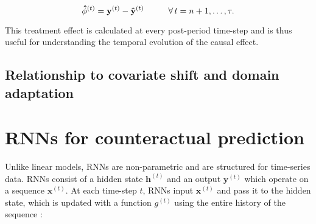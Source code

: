 \documentclass[hidelinks,12pt]{article}
\begin{document}
\begin{equation}
  \mathbf{\hat{\phi}}^{(t)} = \mathbf{y}^{(t)} - \mathbf{\hat{y}}^{(t)} \hspace{10mm} \forall \, t = n+1, \ldots, \tau. \label{eq:pointwise}
\end{equation}

This treatment effect is calculated at every post-period time-step and is thus useful for understanding the temporal evolution of the causal effect.

\subsection{Relationship to covariate shift and domain adaptation}





\section{RNNs for counteractual prediction}

Unlike linear models, RNNs are non-parametric and are structured for time-series data. RNNs consist of a hidden state $\mathbf{h}^{(t)}$ and an output $\mathbf{y}^{(t)}$ which operate on a sequence $\mathbf{x}^{(t)}$. At each time-step $t$, RNNs input $\mathbf{x}^{(t)}$ and pass it to the hidden state, which is updated with a function $g^{(t)}$ using the entire history of the sequence \citep[pp. 337][]{goodfellow2016deep}:
\end{document}
